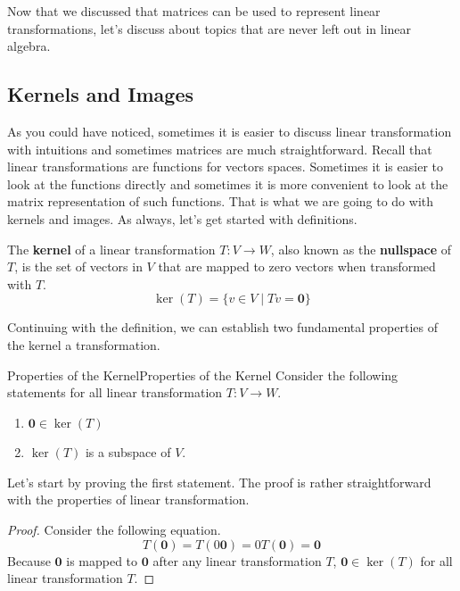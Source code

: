 \documentclass[../main.tex]{subfiles}
\begin{document}
Now that we discussed that matrices can be used to represent linear
transformations, let's discuss about topics that are never left out
in linear algebra.

\subsection{Kernels and Images}

As you could have noticed, sometimes it is easier to discuss linear
transformation with intuitions and sometimes matrices are much
straightforward. Recall that linear transformations are functions
for vectors spaces. Sometimes it is easier to look at the functions
directly and sometimes it is more convenient to look at the matrix
representation of such functions. That is what we are going to do
with kernels and images. As always, let's get started with
definitions.

\begin{definition}
The \textbf{kernel} of a linear transformation $T: V \to W$, also
known as the \textbf{nullspace} of $T$, is the set of vectors in
$V$ that are mapped to zero vectors when transformed with $T$.
\vspace{-0.8\baselineskip}
\[
\ker(T)
= \{ v \in V \mid Tv = \mathbf{0} \}
\]
\end{definition}

Continuing with the definition, we can establish two fundamental
properties of the kernel a transformation.

\begin{theorem}{Properties of the Kernel}{Properties of the Kernel}
Consider the following statements for all linear transformation
$T: V \to W$.
\begin{enumerate}[noitemsep]
\item $\mathbf{0} \in \ker(T)$
\item $\ker(T)$ is a subspace of $V$.
\end{enumerate}
\end{theorem}

Let's start by proving the first statement. The proof is rather
straightforward with the properties of linear transformation.

\begin{proof}
Consider the following equation.
\[
T(\mathbf{0})
= T(0 \mathbf{0})
= 0 T(\mathbf{0})
= \mathbf{0}
\]
Because $\mathbf{0}$ is mapped to $\mathbf{0}$ after any linear
transformation $T$, $\mathbf{0} \in \ker(T)$ for all linear
transformation $T$.
\end{proof}
\end{document}
